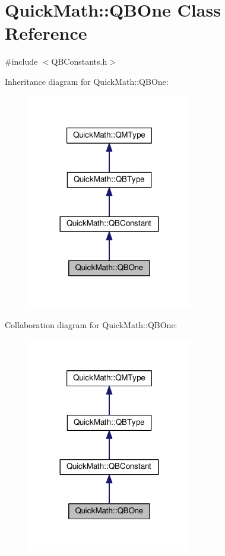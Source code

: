 \hypertarget{classQuickMath_1_1QBOne}{}\section{Quick\+Math\+:\+:Q\+B\+One Class Reference}
\label{classQuickMath_1_1QBOne}


{\ttfamily \#include $<$Q\+B\+Constants.\+h$>$}



Inheritance diagram for Quick\+Math\+:\+:Q\+B\+One\+:
\nopagebreak
\begin{figure}[H]
\begin{center}
\leavevmode
\includegraphics[width=204pt]{classQuickMath_1_1QBOne__inherit__graph}
\end{center}
\end{figure}


Collaboration diagram for Quick\+Math\+:\+:Q\+B\+One\+:
\nopagebreak
\begin{figure}[H]
\begin{center}
\leavevmode
\includegraphics[width=204pt]{classQuickMath_1_1QBOne__coll__graph}
\end{center}
\end{figure}
